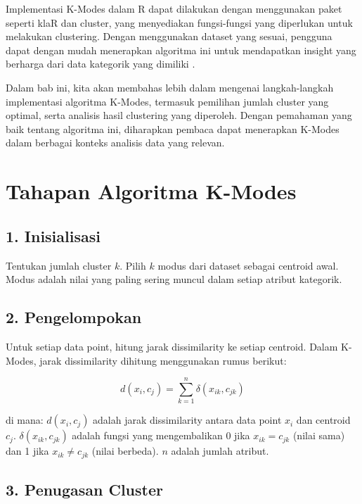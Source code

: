 \documentclass[
  oneside]{book}
\begin{document}
Implementasi K-Modes dalam R dapat dilakukan dengan menggunakan paket
seperti klaR dan cluster, yang menyediakan fungsi-fungsi yang diperlukan
untuk melakukan clustering. Dengan menggunakan dataset yang sesuai,
pengguna dapat dengan mudah menerapkan algoritma ini untuk mendapatkan
insight yang berharga dari data kategorik yang dimiliki
\citep{widyakusuma2024}.

Dalam bab ini, kita akan membahas lebih dalam mengenai langkah-langkah
implementasi algoritma K-Modes, termasuk pemilihan jumlah cluster yang
optimal, serta analisis hasil clustering yang diperoleh. Dengan
pemahaman yang baik tentang algoritma ini, diharapkan pembaca dapat
menerapkan K-Modes dalam berbagai konteks analisis data yang relevan.

\section{Tahapan Algoritma K-Modes}\label{tahapan-algoritma-k-modes}

\subsection*{1. Inisialisasi}\label{inisialisasi-1}

Tentukan jumlah cluster \(k\). Pilih \(k\) modus dari dataset sebagai centroid awal. Modus adalah nilai yang paling sering muncul dalam setiap atribut kategorik.

\subsection*{2. Pengelompokan}\label{pengelompokan}

Untuk setiap data point, hitung jarak dissimilarity ke setiap centroid. Dalam K-Modes, jarak dissimilarity dihitung menggunakan rumus berikut:

\[
d(x_i, c_j) = \sum_{k=1}^{n} \delta(x_{ik}, c_{jk})
\]

di mana: \(d(x_i, c_j)\) adalah jarak dissimilarity antara data point \(x_i\) dan centroid \(c_j\). \(\delta(x_{ik}, c_{jk})\) adalah fungsi yang mengembalikan 0 jika \(x_{ik} = c_{jk}\) (nilai sama) dan 1 jika \(x_{ik} \neq c_{jk}\) (nilai berbeda). \(n\) adalah jumlah atribut.

\subsection*{3. Penugasan Cluster}\label{penugasan-cluster-1}
\end{document}
